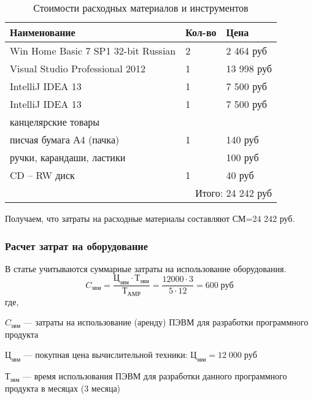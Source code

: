 \renewcommand{\arraystretch}{1.4} %
\begin{table}[htb]
	\caption{Стоимости расходных материалов и инструментов}\label{tab:a}
    \centering
        \begin{tabular}{|l|l|l|}
        		\hline
        		Наименование & Кол-во & Цена \\
        		\hline
        		Win Home Basic 7 SP1 32-bit Russian & 2 & 2 464 руб \\
        		\hline
        		Visual Studio Professional 2012 & 1 & 13 998 руб\\
        		\hline
        		IntelliJ IDEA 13 & 1 & 7 500 руб\\ 
        		\hline
        		IntelliJ IDEA 13 & 1 & 7 500 руб\\ 
        		\hline
        		\multicolumn{3}{|l|}{канцелярские товары}\\
        		\hline
        		писчая бумага А4 (пачка) & 1 & 140 руб\\
        		\hline
        		ручки, карандаши, ластики &   & 100 руб\\
        		\hline
        		CD – RW диск & 1 & 40 руб\\
        		\hline
        		\multicolumn{3}{|r|}{Итого: 24 242 руб }\\
        		\hline
        \end{tabular}
    		
\end{table}

Получаем, что  затраты на расходные материалы составляют 
СМ=24 242 руб.


\subsubsection{Расчет затрат на оборудование}

В статье учитываются суммарные затраты на использование оборудования.
$$ 
C_{эвм}=
\frac{Ц_{эвм} \cdot Т_{эвм}}{Т_{АМР}} =
\frac{12 000 \cdot 3}{5 \cdot 12} = 
600 \; руб
$$
где, 

$C_{эвм}$ — затраты на использование (аренду) ПЭВМ для разработки программного продукта

$Ц_{эвм}$ — покупная цена вычислительной техники: $Ц_{эвм} = 12 \; 000 \; руб$

$Т_{эвм}$ — время использования ПЭВМ для разработки данного программного продукта в месяцах (3 месяца)

